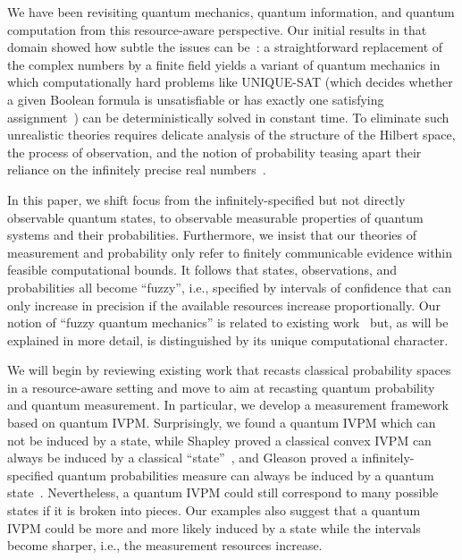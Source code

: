 \documentclass[12pt]{iopart}
\theoremstyle{remark}
\begin{document}
We have been revisiting quantum mechanics, quantum information, and
quantum computation from this resource-aware perspective. Our initial
results in that domain showed how subtle the issues can be~\cite{usat,geometry2013,DQT2014}:
a straightforward replacement of the complex numbers by a finite field
yields a variant of quantum mechanics in which computationally hard
problems like UNIQUE-SAT (which decides whether a given Boolean formula
is unsatisfiable or has exactly one satisfying assignment~\cite{Valiant198685,Papadimitriou1993,AroraBarak2009})
can be deterministically solved in constant time. To eliminate such
unrealistic theories requires delicate analysis of the structure of
the Hilbert space, the process of observation, and the notion of probability
teasing apart their reliance on the infinitely precise real numbers~\cite{geometry2013,DQT2014}. 

In this paper, we shift focus from the infinitely-specified but not
directly observable quantum states, to observable measurable properties
of quantum systems and their probabilities. Furthermore, we insist
that our theories of measurement and probability only refer to finitely
communicable evidence within feasible computational bounds. It follows
that states, observations, and probabilities all become ``fuzzy'',
i.e., specified by intervals of confidence that can only increase
in precision if the available resources increase proportionally. Our
notion of ``fuzzy quantum mechanics'' is related to existing work~\cite{GranikCaulfield1996,Pykacz2013,SNL2009,Gudder2005,aerts1993physical}
but, as will be explained in more detail, is distinguished by its
unique computational character.

We will begin by reviewing existing work that recasts classical probability
spaces in a resource-aware setting and move to aim at recasting quantum
probability and quantum measurement. In particular, we develop a measurement
framework based on quantum IVPM. Surprisingly, we found a quantum
IVPM which can not be induced by a state, while Shapley proved a classical
convex IVPM can always be induced by a classical ``state''~\cite{Shapley1971,Grabisch2016},
and Gleason proved a infinitely-specified quantum probabilities measure
can always be induced by a quantum state~\cite{gleason1957,Redhead1987-REDINA,peres1995quantum}.
Nevertheless, a quantum IVPM could still correspond to many possible
states if it is broken into pieces. Our examples also suggest that
a quantum IVPM could be more and more likely induced by a state while
the intervals become sharper, i.e., the measurement resources increase.
\end{document}
